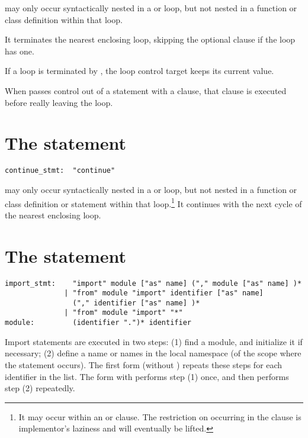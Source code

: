  may only occur syntactically nested in a 
or  loop, but not nested in a function or class definition
within that loop.

It terminates the nearest enclosing loop, skipping the optional
 clause if the loop has one.

If a  loop is terminated by , the loop control
target keeps its current value.

When  passes control out of a  statement
with a  clause, that  clause is executed
before really leaving the loop.

\section{The  statement \label{continue}}

\begin{verbatim}
continue_stmt:  "continue"
\end{verbatim}

 may only occur syntactically nested in a  or
 loop, but not nested in a function or class definition or
 statement within that loop.\footnote{It may
occur within an  or  clause.  The
restriction on occurring in the  clause is implementor's
laziness and will eventually be lifted.}
It continues with the next cycle of the nearest enclosing loop.

\section{The  statement \label{import}}

\begin{verbatim}
import_stmt:    "import" module ["as" name] ("," module ["as" name] )* 
              | "from" module "import" identifier ["as" name]
                ("," identifier ["as" name] )*
              | "from" module "import" "*" 
module:         (identifier ".")* identifier
\end{verbatim}

Import statements are executed in two steps: (1) find a module, and
initialize it if necessary; (2) define a name or names in the local
namespace (of the scope where the  statement occurs).
The first form (without ) repeats these steps for each
identifier in the list.  The form with  performs step
(1) once, and then performs step (2) repeatedly.

